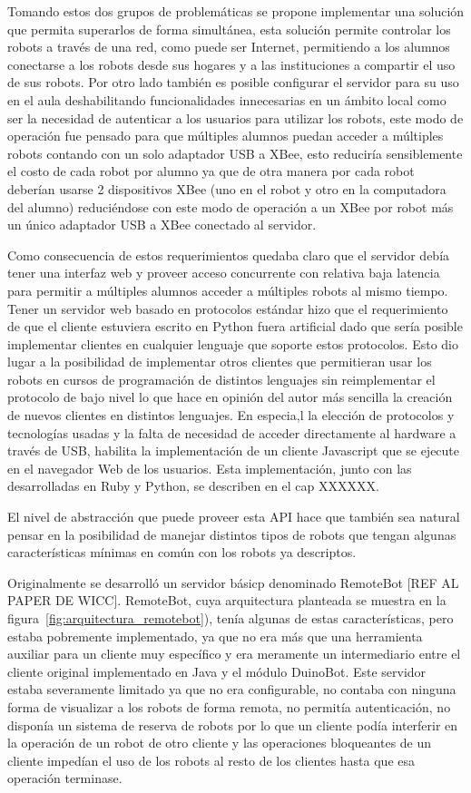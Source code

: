 Tomando estos dos grupos de problemáticas se propone implementar una solución
que permita
superarlos de forma simultánea, esta solución permite controlar los
robots a través de una red, como puede ser Internet, permitiendo a los alumnos
conectarse a los robots desde sus hogares y a las instituciones a compartir
el uso de sus robots. Por otro lado también es posible configurar el servidor
para su uso en el aula deshabilitando funcionalidades innecesarias en un ámbito
local como ser la necesidad de autenticar a los usuarios para utilizar los
robots, este modo de operación fue pensado para que múltiples alumnos puedan
acceder a múltiples robots contando con un solo adaptador USB a XBee, esto
reduciría sensiblemente el costo de cada robot por alumno ya que de otra
manera por cada robot deberían usarse 2 dispositivos XBee (uno en el robot
y otro en la computadora del alumno) reduciéndose con este modo de operación
a un XBee por robot más un único adaptador USB a XBee conectado al servidor.

Como consecuencia de estos requerimientos quedaba claro que el servidor
debía tener una interfaz web y proveer acceso concurrente con relativa
baja latencia para permitir a múltiples alumnos acceder a múltiples robots
al mismo tiempo. Tener un servidor web basado en protocolos estándar hizo
que el requerimiento de que el cliente estuviera escrito en Python fuera
artificial dado que sería posible implementar clientes en cualquier lenguaje
que soporte estos protocolos. Esto dio lugar a la posibilidad de
implementar otros clientes que permitieran usar los robots en cursos
de programación de distintos lenguajes sin reimplementar el protocolo
de bajo nivel lo que hace en opinión del autor más sencilla la creación
de nuevos clientes en distintos lenguajes.
En especia,l la elección de protocolos y tecnologías usadas
y la falta de necesidad de acceder directamente al hardware a través de USB,
habilita la implementación de un cliente Javascript que se ejecute en el
navegador Web de los usuarios. Esta implementación, junto con las desarrolladas en Ruby y Python, se describen en el cap XXXXXX.

El nivel de abstracción que puede proveer esta API hace que también sea
natural pensar en la posibilidad de manejar distintos tipos de robots
que tengan algunas características mínimas en común con los robots ya
descriptos.

Originalmente se desarrolló un servidor básicp denominado RemoteBot [REF AL PAPER DE WICC]. RemoteBot, cuya arquitectura planteada se muestra en la figura~\ref{fig:arquitectura_remotebot}), 
tenía algunas de estas características, pero
estaba pobremente implementado, ya que no era más que una herramienta auxiliar
para un cliente muy específico y era meramente un intermediario entre el
cliente original implementado en Java y el módulo DuinoBot. Este servidor
estaba severamente limitado
ya que no era configurable, no contaba con ninguna forma de visualizar a los
robots de forma remota, no permitía autenticación, no disponía un sistema
de reserva de robots por lo que un cliente podía interferir en la operación
de un robot de otro cliente y las operaciones bloqueantes de un cliente
impedían el uso de los robots al resto de los clientes hasta que esa operación
terminase.


